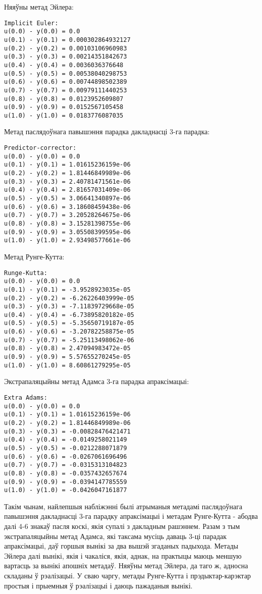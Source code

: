 Няяўны метад Эйлера:
{\small
\begin{verbatim}
Implicit Euler:
u(0.0) - y(0.0) = 0.0
u(0.1) - y(0.1) = 0.000302864932127
u(0.2) - y(0.2) = 0.00103106960983
u(0.3) - y(0.3) = 0.00214351842673
u(0.4) - y(0.4) = 0.0036036376648
u(0.5) - y(0.5) = 0.00538040298753
u(0.6) - y(0.6) = 0.00744898502389
u(0.7) - y(0.7) = 0.00979111440253
u(0.8) - y(0.8) = 0.0123952609807
u(0.9) - y(0.9) = 0.0152567105458
u(1.0) - y(1.0) = 0.0183776087035
\end{verbatim}
}

Метад паслядоўнага павышэння парадка дакладнасці 3-га парадка:
{\small
\begin{verbatim}
Predictor-corrector:
u(0.0) - y(0.0) = 0.0
u(0.1) - y(0.1) = 1.01615236159e-06
u(0.2) - y(0.2) = 1.81446849989e-06
u(0.3) - y(0.3) = 2.40781471561e-06
u(0.4) - y(0.4) = 2.81657031409e-06
u(0.5) - y(0.5) = 3.06641340897e-06
u(0.6) - y(0.6) = 3.18608459438e-06
u(0.7) - y(0.7) = 3.20528264675e-06
u(0.8) - y(0.8) = 3.15281398755e-06
u(0.9) - y(0.9) = 3.05508399595e-06
u(1.0) - y(1.0) = 2.93498577661e-06
\end{verbatim}
}

Метад Рунге-Кутта:
{\small
\begin{verbatim}
Runge-Kutta:
u(0.0) - y(0.0) = 0.0
u(0.1) - y(0.1) = -3.9528923035e-05
u(0.2) - y(0.2) = -6.26226403999e-05
u(0.3) - y(0.3) = -7.11839729668e-05
u(0.4) - y(0.4) = -6.73895820182e-05
u(0.5) - y(0.5) = -5.35650719187e-05
u(0.6) - y(0.6) = -3.20782258875e-05
u(0.7) - y(0.7) = -5.25113498062e-06
u(0.8) - y(0.8) = 2.47094983472e-05
u(0.9) - y(0.9) = 5.57655270245e-05
u(1.0) - y(1.0) = 8.60861279295e-05
\end{verbatim}
}

Экстрапаляцыйны метад Адамса 3-га парадка апраксімацыі:
{\small
\begin{verbatim}
Extra Adams:
u(0.0) - y(0.0) = 0.0
u(0.1) - y(0.1) = 1.01615236159e-06
u(0.2) - y(0.2) = 1.81446849989e-06
u(0.3) - y(0.3) = -0.00828476421471
u(0.4) - y(0.4) = -0.0149258021149
u(0.5) - y(0.5) = -0.0212288071879
u(0.6) - y(0.6) = -0.0267061696496
u(0.7) - y(0.7) = -0.0315313104823
u(0.8) - y(0.8) = -0.0357432657674
u(0.9) - y(0.9) = -0.0394147785559
u(1.0) - y(1.0) = -0.0426047161877
\end{verbatim}
}

Такім чынам, найлепшыя набліжэнні былі атрыманыя метадамі паслядоўнага павышэння дакладнасці 3-га парадку апраксімацыі і метадам Рунге-Кутта - абодва далі 4-6 знакаў пасля коскі, якія супалі з дакладным рашэннем. Разам з тым экстрапаляцыйны метад Адамса, які таксама мусіць даваць 3-ці парадак апраксімацыі, даў горшыя вынікі за два вышэй згаданых падыхода. Метады Эйлера далі вынікі, якія і чакаліся, якія, аднак, на практыцы маюць меншую вартасць за вынікі апошніх метадаў. Няяўны метад Эйлера, да таго ж, адносна складаны ў рэалізацыі. У сваю чаргу, метады Рунге-Кутта і прэдыктар-карэктар простыя і прыемныя ў рэалізацыі і даюць пажаданыя вынікі.

